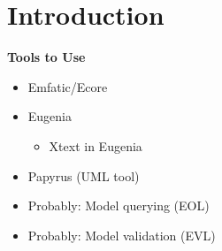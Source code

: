 \section{Introduction}

\textbf{Tools to Use}
\begin{itemize}
	\item Emfatic/Ecore
	\item Eugenia
\begin{itemize}
	\item Xtext in Eugenia 
\end{itemize}
	\item Papyrus (UML tool)
	
	\item Probably: Model querying (EOL)
	\item Probably: Model validation (EVL)

\end{itemize}